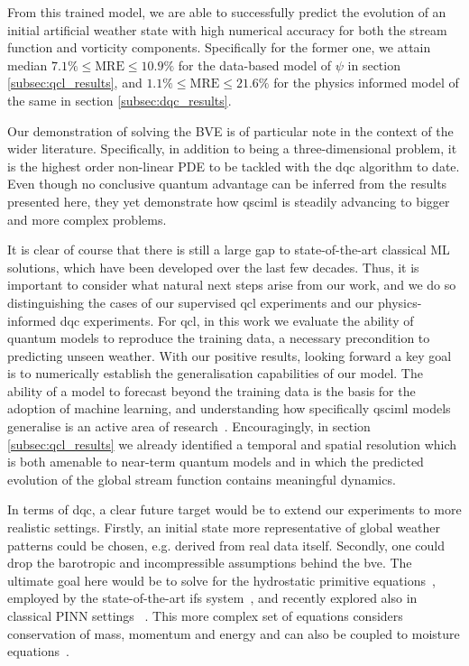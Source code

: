 \documentclass[aps,pra,a4paper,twocolumn,longbibliography,groupedaddress]{revtex4-2}
\begin{document}
From this trained model, we are able to successfully predict the evolution of an initial artificial weather state with high numerical accuracy for both the stream function and vorticity components. Specifically for the former one, we attain median $7.1\% \leq \text{MRE} \leq 10.9\%$ for the data-based model of $\psi$ in section \ref{subsec:qcl_results}, and $1.1\% \leq \text{MRE} \leq 21.6\%$ for the physics informed model of the same in section \ref{subsec:dqc_results}.

Our demonstration of solving the BVE is of particular note in the context of the wider literature. Specifically, in addition to being a three-dimensional problem, it is the highest order non-linear PDE to be tackled with the \gls{dqc} algorithm to date. {Even though no conclusive quantum advantage can be inferred from the results presented here, they yet demonstrate how \gls{qsciml} is steadily advancing to bigger and more complex problems.} 

It is clear of course that there is still a large gap to state-of-the-art classical ML solutions, which have been developed over the last few decades. Thus, it is important to consider what natural next steps arise from our work, and we do so distinguishing the cases of our supervised \gls{qcl} experiments and our physics-informed \gls{dqc} experiments.
For \gls{qcl}, in this work we evaluate the ability of quantum models to reproduce the training data, a necessary precondition to predicting unseen weather. With our positive results, looking forward a key goal is to numerically establish the generalisation capabilities of our model. The ability of a model to forecast beyond the training data is the basis for the adoption of machine learning, and understanding how specifically \gls{qsciml} models generalise is an active area of research~\cite{caro2022generalization, peters2023generalization}. Encouragingly, in section \ref{subsec:qcl_results} we already identified a temporal and spatial resolution which is both amenable to near-term quantum models and in which the predicted evolution of the global stream function contains meaningful dynamics. 

In terms of \gls{dqc}, a clear future target would be to extend our experiments to more realistic settings. 
Firstly, an initial state more representative of global weather patterns could be chosen, e.g. derived from real data itself. Secondly, one could drop the barotropic and incompressible assumptions behind the \gls{bve}. The ultimate goal here would be to solve for the hydrostatic primitive equations~\cite{iskandarani2003three}, employed by the state-of-the-art \gls{ifs} system~\cite{ecmwfNonhydrostaticFinitevolume}, and recently explored also in classical PINN settings ~\cite{wong2022learning, hu2023higher}. This more complex set of equations considers conservation of mass, momentum and energy and can also be coupled to moisture equations~\cite{taylor2011conservation}. 
\end{document}
